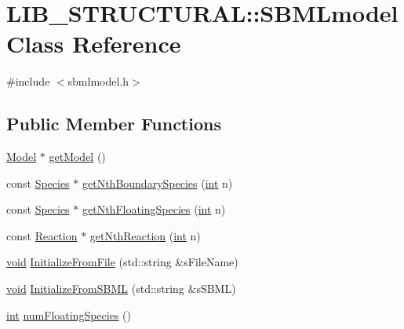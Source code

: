 \hypertarget{class_l_i_b___s_t_r_u_c_t_u_r_a_l_1_1_s_b_m_lmodel}{}\section{L\+I\+B\+\_\+\+S\+T\+R\+U\+C\+T\+U\+R\+AL\+:\+:S\+B\+M\+Lmodel Class Reference}
\label{class_l_i_b___s_t_r_u_c_t_u_r_a_l_1_1_s_b_m_lmodel}


{\ttfamily \#include $<$sbmlmodel.\+h$>$}

\subsection*{Public Member Functions}
\begin{DoxyCompactItemize}
\item 
\hyperlink{class_model}{Model} $\ast$ \hyperlink{class_l_i_b___s_t_r_u_c_t_u_r_a_l_1_1_s_b_m_lmodel_a3c2622f00a1a1fd80680b5336e41398e}{get\+Model} ()
\item 
const \hyperlink{class_species}{Species} $\ast$ \hyperlink{class_l_i_b___s_t_r_u_c_t_u_r_a_l_1_1_s_b_m_lmodel_a719d149d5b6e7d85a0ebc7806232ab8f}{get\+Nth\+Boundary\+Species} (\hyperlink{lp__lib_8h_adeb9ec6400320e4923ac9d836d509ddb}{int} n)
\item 
const \hyperlink{class_species}{Species} $\ast$ \hyperlink{class_l_i_b___s_t_r_u_c_t_u_r_a_l_1_1_s_b_m_lmodel_a2d89b0007fc318b45ac2f0fb5189922c}{get\+Nth\+Floating\+Species} (\hyperlink{lp__lib_8h_adeb9ec6400320e4923ac9d836d509ddb}{int} n)
\item 
const \hyperlink{class_reaction}{Reaction} $\ast$ \hyperlink{class_l_i_b___s_t_r_u_c_t_u_r_a_l_1_1_s_b_m_lmodel_a56a1c1bb159e0205dcc8171c525d6c70}{get\+Nth\+Reaction} (\hyperlink{lp__lib_8h_adeb9ec6400320e4923ac9d836d509ddb}{int} n)
\item 
\hyperlink{lp__lib_8h_ac7828c7b2b31d2e11af17bdb6289c5d9}{void} \hyperlink{class_l_i_b___s_t_r_u_c_t_u_r_a_l_1_1_s_b_m_lmodel_a96e6417b69e14be811a5d61843b93f05}{Initialize\+From\+File} (std\+::string \&s\+File\+Name)
\item 
\hyperlink{lp__lib_8h_ac7828c7b2b31d2e11af17bdb6289c5d9}{void} \hyperlink{class_l_i_b___s_t_r_u_c_t_u_r_a_l_1_1_s_b_m_lmodel_aebb4a271b679f4f17975389b1125ca80}{Initialize\+From\+S\+B\+ML} (std\+::string \&s\+S\+B\+ML)
\item 
\hyperlink{lp__lib_8h_adeb9ec6400320e4923ac9d836d509ddb}{int} \hyperlink{class_l_i_b___s_t_r_u_c_t_u_r_a_l_1_1_s_b_m_lmodel_a8034301c2a1708f55bbe8ba1f35a467b}{num\+Floating\+Species} ()

\end{DoxyCompactItemize}

